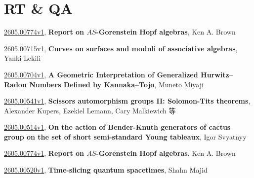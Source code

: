 \documentclass[9pt, a4paper]{article}
\theoremstyle{plain}
\theoremstyle{definition}
\theoremstyle{remark}
\newcommand{\arxiv}[3]{\href{https://arxiv.org/abs/#1}{#1}, \textbf{\textcolor{arxivblue}{#2}}, #3}
\begin{document}
\section{RT \& QA}
\arxiv{2605.00774v1}{Report on $AS$-Gorenstein Hopf algebras}{Ken A. Brown}

\arxiv{2605.00715v1}{Curves on surfaces and moduli of associative algebras}{Yanki Lekili}

\arxiv{2605.00704v1}{A Geometric Interpretation of Generalized Hurwitz--Radon Numbers Defined by Kannaka--Tojo}{Muneto Miyaji}

\arxiv{2605.00541v1}{Scissors automorphism groups II: Solomon-Tits theorems}{Alexander Kupers, Ezekiel Lemann, Cary Malkiewich 等}

\arxiv{2605.00514v1}{On the action of Bender-Knuth generators of cactus group on the set of short semi-standard Young tableaux}{Igor Svyatnyy}

\arxiv{2605.00774v1}{Report on $AS$-Gorenstein Hopf algebras}{Ken A. Brown}

\arxiv{2605.00520v1}{Time-slicing quantum spacetimes}{Shahn Majid}

\end{document}

